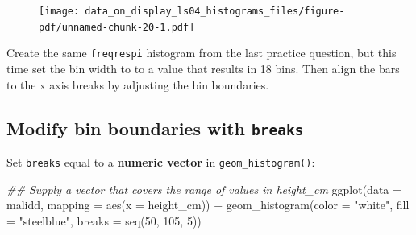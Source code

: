 \documentclass[
  letterpaper,
  DIV=11,
  numbers=noendperiod]{scrreprt}
\newenvironment{Shaded}{\begin{snugshade}}{\end{snugshade}}
\newcommand{\AttributeTok}[1]{\textcolor[rgb]{0.40,0.45,0.13}{#1}}
\newcommand{\DecValTok}[1]{\textcolor[rgb]{0.68,0.00,0.00}{#1}}
\newcommand{\DocumentationTok}[1]{\textcolor[rgb]{0.37,0.37,0.37}{\textit{#1}}}
\newcommand{\FunctionTok}[1]{\textcolor[rgb]{0.28,0.35,0.67}{#1}}
\newcommand{\NormalTok}[1]{\textcolor[rgb]{0.00,0.23,0.31}{#1}}
\newcommand{\SpecialCharTok}[1]{\textcolor[rgb]{0.37,0.37,0.37}{#1}}
\newcommand{\StringTok}[1]{\textcolor[rgb]{0.13,0.47,0.30}{#1}}
\begin{document}
\begin{figure}[H]

{\centering \texttt{[image: data\_on\_display\_ls04\_histograms\_files/figure-pdf/unnamed-chunk-20-1.pdf]}

}

\end{figure}

\begin{tcolorbox}[enhanced jigsaw, colframe=quarto-callout-tip-color-frame, rightrule=.15mm, opacityback=0, breakable, coltitle=black, colbacktitle=quarto-callout-tip-color!10!white, bottomrule=.15mm, leftrule=.75mm, toprule=.15mm, arc=.35mm, bottomtitle=1mm, colback=white, left=2mm, opacitybacktitle=0.6, titlerule=0mm, title=\textcolor{quarto-callout-tip-color}{\faLightbulb}\hspace{0.5em}{Practice}, toptitle=1mm]

Create the same \texttt{freqrespi} histogram from the last practice
question, but this time set the bin width to to a value that results in
18 bins. Then align the bars to the x axis breaks by adjusting the bin
boundaries.

\end{tcolorbox}

\hypertarget{modify-bin-boundaries-with-breaks}{%
\subsection{\texorpdfstring{Modify bin boundaries with
\texttt{breaks}}{Modify bin boundaries with breaks}}\label{modify-bin-boundaries-with-breaks}}

Set \texttt{breaks} equal to a \textbf{numeric vector} in
\texttt{geom\_histogram()}:

\begin{Shaded}
\begin{Highlighting}[]
\DocumentationTok{\#\# Supply a vector that covers the range of values in height\_cm}
\FunctionTok{ggplot}\NormalTok{(}\AttributeTok{data =}\NormalTok{  malidd, }
       \AttributeTok{mapping =} \FunctionTok{aes}\NormalTok{(}\AttributeTok{x =}\NormalTok{ height\_cm)) }\SpecialCharTok{+}
  \FunctionTok{geom\_histogram}\NormalTok{(}\AttributeTok{color =} \StringTok{"white"}\NormalTok{, }
                 \AttributeTok{fill =} \StringTok{"steelblue"}\NormalTok{,}
                 \AttributeTok{breaks =} \FunctionTok{seq}\NormalTok{(}\DecValTok{50}\NormalTok{, }\DecValTok{105}\NormalTok{, }\DecValTok{5}\NormalTok{))}
\end{Highlighting}
\end{Shaded}
\end{document}
